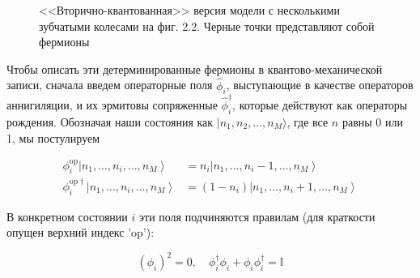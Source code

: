 \documentclass[main.tex]{subfiles}
\begin{document}
\begin{figure}[ht]
\begin{center}
\caption{
\label{i15.1} <<Вторично-квантованная>> версия модели с несколькими зубчатыми колесами на фиг. 2.2. Черные точки представляют собой фермионы}
\end {center}
\end {figure}

Чтобы описать эти детерминированные фермионы в квантово-механической записи, сначала введем операторные поля $\hat\phi_i$, выступающие в качестве операторов аннигиляции, и их эрмитовы сопряженные $\hat\phi_i^\dagger$, которые действуют как операторы рождения. Обозначая наши состояния как $| n_1, n_2,\ldots,n_M\rangle$, где все $n$ равны 0 или 1, мы постулируем

\begin{equation}\label{15.3}
	\begin{aligned} \phi_{i}^{\mathrm{op}}\left|n_{1}, \ldots, n_{i}, \ldots, n_{M}\right\rangle &= n_{i}\left|n_{1}, \ldots, n_{i}-1, \ldots, n_{M}\right\rangle \\ \phi_{i}^{\mathrm{op\dagger}}\left|n_{1}, \ldots, n_{i}, \ldots, n_{M}\right\rangle &=\left(1-n_{i}\right)\left|n_{1}, \ldots, n_{i}+1, \ldots, n_{M}\right\rangle \end{aligned}
\end{equation}

В конкретном состоянии $i$ эти поля подчиняются правилам (для краткости опущен верхний индекс 'op'):

\begin{equation}\label{15.4}
	\left(\phi_{i}\right)^{2}=0, \quad \phi_{i}^{\dagger} \phi_{i} + \phi_{i} \phi_{i}^{\dagger} = \mathbb{I}
\end{equation}
\end{document}
